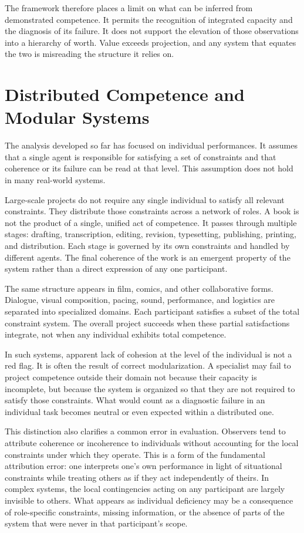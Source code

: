 \documentclass[12pt, a4paper]{article}
\begin{document}
The framework therefore places a limit on what can be inferred from demonstrated competence. It permits the recognition of integrated capacity and the diagnosis of its failure. It does not support the elevation of those observations into a hierarchy of worth. Value exceeds projection, and any system that equates the two is misreading the structure it relies on.

\section{Distributed Competence and Modular Systems}

The analysis developed so far has focused on individual performances. It assumes that a single agent is responsible for satisfying a set of constraints and that coherence or its failure can be read at that level. This assumption does not hold in many real-world systems.

Large-scale projects do not require any single individual to satisfy all relevant constraints. They distribute those constraints across a network of roles. A book is not the product of a single, unified act of competence. It passes through multiple stages: drafting, transcription, editing, revision, typesetting, publishing, printing, and distribution. Each stage is governed by its own constraints and handled by different agents. The final coherence of the work is an emergent property of the system rather than a direct expression of any one participant.

The same structure appears in film, comics, and other collaborative forms. Dialogue, visual composition, pacing, sound, performance, and logistics are separated into specialized domains. Each participant satisfies a subset of the total constraint system. The overall project succeeds when these partial satisfactions integrate, not when any individual exhibits total competence.

In such systems, apparent lack of cohesion at the level of the individual is not a red flag. It is often the result of correct modularization. A specialist may fail to project competence outside their domain not because their capacity is incomplete, but because the system is organized so that they are not required to satisfy those constraints. What would count as a diagnostic failure in an individual task becomes neutral or even expected within a distributed one.

This distinction also clarifies a common error in evaluation. Observers tend to attribute coherence or incoherence to individuals without accounting for the local constraints under which they operate. This is a form of the fundamental attribution error: one interprets one's own performance in light of situational constraints while treating others as if they act independently of theirs. In complex systems, the local contingencies acting on any participant are largely invisible to others. What appears as individual deficiency may be a consequence of role-specific constraints, missing information, or the absence of parts of the system that were never in that participant's scope.
\end{document}
